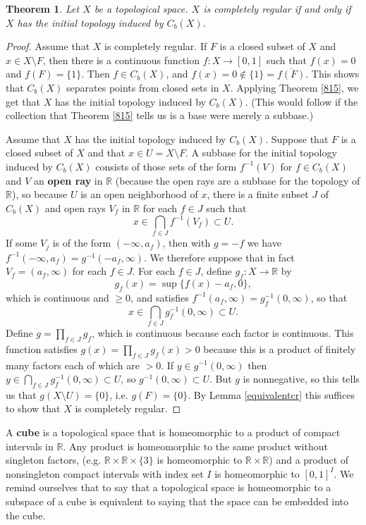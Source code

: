 \documentclass{article}
\newtheorem{theorem}{Theorem}
\theoremstyle{definition}
\begin{document}
\begin{theorem}
Let $X$ be a topological space. $X$ is completely regular if and only if $X$ has the initial topology induced by $C_b(X)$. 
\label{Cbinduced}
\end{theorem}
\begin{proof}
Assume that $X$ is completely regular. If $F$ is a closed subset of $X$ and $x \in X \setminus F$, 
then there is a continuous function $f:X \to [0,1]$ such that $f(x)=0$ and $f(F)=\{1\}$. Then $f \in C_b(X)$,
and $f(x)=0 \not \in \{1\} =  \overline{f(F)}$. This shows that $C_b(X)$ separates points from closed sets in $X$.
Applying Theorem \ref{815}, we get that $X$ has the initial topology induced by $C_b(X)$. (This would follow if the collection that
Theorem \ref{815} tells us is a base
were merely a subbase.)

Assume that $X$ has the initial topology induced by $C_b(X)$.
Suppose that $F$ is a closed subset of $X$ and that $x \in U=X \setminus F$.
A subbase for the initial topology induced by $C_b(X)$ consists of those sets of the form $f^{-1}(V)$ for $f \in C_b(X)$ and $V$ an \textbf{open ray} in
$\mathbb{R}$ (because the open rays are a subbase for the topology of $\mathbb{R}$), so because $U$ is an open neighborhood of $x$,
there is a finite subset $J$ of $C_b(X)$ and open rays $V_f$ in $\mathbb{R}$ for each $f \in J$ such that
\[
x \in \bigcap_{f \in J} f^{-1}(V_f) \subset U.
\] 
If some $V_j$ is of the form $(-\infty,a_f)$, then with $g=-f$  we have $f^{-1}(-\infty,a_f)=g^{-1}(-a_f,\infty)$. We therefore
suppose that in fact $V_f = (a_f,\infty)$ for each $f \in J$. For each $f \in J$, define
$g_f:X \to \mathbb{R}$ by
\[
g_f(x) = \sup \{ f(x)-a_f, 0\},
\]
which is continuous and $\geq 0$, and satisfies
$f^{-1}(a_f,\infty) = g_f^{-1}(0,\infty)$, so that 
\[
x \in \bigcap_{f \in J} g_f^{-1}(0,\infty) \subset U.
\]
Define $g=\prod_{f \in J} g_f$, which is continuous because each factor is continuous.
 This function satisfies $g(x) = \prod_{f \in J} g_f(x)>0$ because this is a product of finitely many
factors each of which are $>0$. If $y \in g^{-1}(0,\infty)$ then 
$y \in \bigcap_{f \in J} g_f^{-1}(0,\infty) \subset U$, so $g^{-1}(0,\infty) \subset U$. 
But $g$ is nonnegative, so this tells us that $g(X \setminus U)=\{0\}$, i.e. $g(F)=\{0\}$.  
By Lemma \ref{equivalentcr} this suffices to show that $X$ is completely regular.
\end{proof}



A \textbf{cube} is a topological space that is homeomorphic to a product of compact intervals in $\mathbb{R}$.
Any product is homeomorphic to the same product without singleton factors, (e.g. $\mathbb{R} \times
\mathbb{R} \times \{3\}$ is homeomorphic
to $\mathbb{R} \times \mathbb{R}$) and a product 
of nonsingleton compact intervals with index set $I$
is  homeomorphic to $[0,1]^I$.
We remind ourselves that to say that a topological space is homeomorphic to a subspace of a cube is equivalent to saying that the space can be embedded into the cube.
\end{document}
